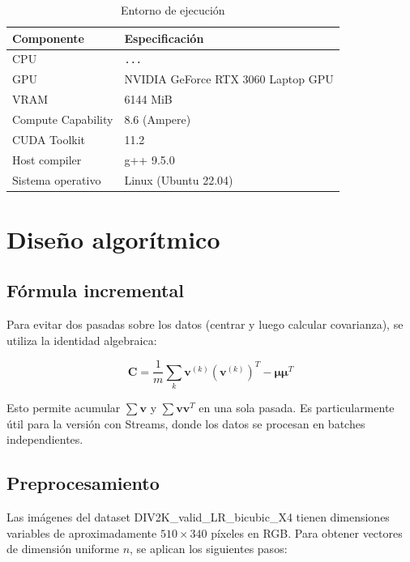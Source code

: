 \documentclass[12pt,a4paper]{article}
\begin{document}
\begin{table}[H]
\centering
\begin{tabular}{ll}
\toprule
Componente & Especificación \\
\midrule
CPU & \texttt{...} \\
GPU & NVIDIA GeForce RTX 3060 Laptop GPU \\
VRAM & 6144 MiB \\
Compute Capability & 8.6 (Ampere) \\
CUDA Toolkit & 11.2 \\
Host compiler & g++ 9.5.0 \\
Sistema operativo & Linux (Ubuntu 22.04) \\
\bottomrule
\end{tabular}
\caption{Entorno de ejecución}
\end{table}

\section{Diseño algorítmico}

\subsection{Fórmula incremental}

Para evitar dos pasadas sobre los datos (centrar y luego calcular covarianza),
se utiliza la identidad algebraica:

\begin{equation}
\mathbf{C} = \frac{1}{m}\sum_{k} \mathbf{v}^{(k)}(\mathbf{v}^{(k)})^T
            - \boldsymbol{\mu}\boldsymbol{\mu}^T
\end{equation}

Esto permite acumular $\sum \mathbf{v}$ y $\sum \mathbf{v}\mathbf{v}^T$ en una
sola pasada. Es particularmente útil para la versión con Streams, donde los
datos se procesan en batches independientes.

\subsection{Preprocesamiento}

Las imágenes del dataset DIV2K\_valid\_LR\_bicubic\_X4 tienen dimensiones
variables de aproximadamente $510 \times 340$ píxeles en RGB. Para obtener
vectores de dimensión uniforme $n$, se aplican los siguientes pasos:
\end{document}
